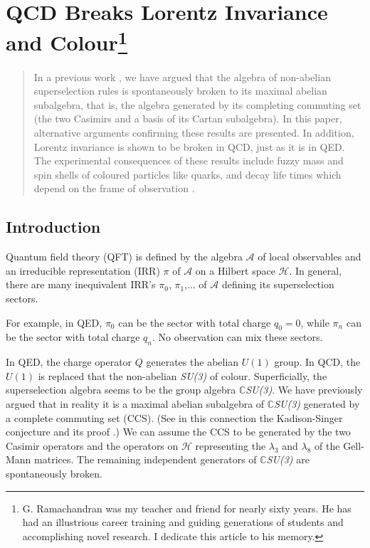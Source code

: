 \chapter[QCD Breaks Lorentz Invariance and Colour]{QCD Breaks Lorentz Invariance and Colour\footnote[*]{G. Ramachandran was my teacher and friend for nearly sixty years. He has had an illustrious career training and guiding generations of students and accomplishing novel research. I dedicate this article to his memory.}}\label{chap4}


\begin{abstract}
In a previous work \cite{chap4-key1}, we have argued that the algebra of non-abelian superselection rules is spontaneously broken to its maximal abelian subalgebra, that is, the algebra generated by its completing commuting set (the two Casimirs and a basis of its Cartan subalgebra). In this paper, alternative arguments confirming these results are presented. In addition, Lorentz invariance is shown to be broken in QCD, just as it is in QED. The experimental consequences of these results include fuzzy mass and spin shells of coloured particles like quarks, and decay life times which depend on the frame of observation \cite{chap4-key2,chap4-key3,chap4-key4}.
\end{abstract}

\section{Introduction}\label{chap4-sec1}

Quantum field theory (QFT) is defined by the algebra $\mathcal{A}$ of local observables and an irreducible representation (IRR) $\pi$ of $\mathcal{A}$ on a Hilbert space $\mathcal{H}$. In general, there are many inequivalent IRR's $\pi_{0}$, $\pi_{1}$,... of $\mathcal{A}$ defining its superselection sectors.

For example, in QED, $\pi_{0}$ can be the sector with total charge $q_{0}= 0$, while $\pi_{n}$ can be the sector with total charge $q_{n}$. No observation can mix these sectors.

In QED, the charge operator $Q$ generates the abelian $U(1)$ group. In QCD, the $U(1)$ is replaced that the non-abelian \textit{SU(3)} of colour. Superficially, the superselection algebra seems to be the group algebra $\mathbb{C}$\textit{SU(3)}. We have previously argued \cite{chap4-key1} that in reality it is a maximal abelian subalgebra of $\mathbb{C}$\textit{SU(3)} generated by a complete commuting set (CCS). (See in this connection the Kadison-Singer conjecture and its proof \cite{chap4-key5}.) We can assume the CCS to be generated by the two Casimir operators and the operators on $\mathcal{H}$ representing the $\lambda_{3}$ and $\lambda_{8}$ of the Gell-Mann matrices. The remaining independent generators of $\mathbb{C}$\textit{SU(3)} are spontaneously broken.

